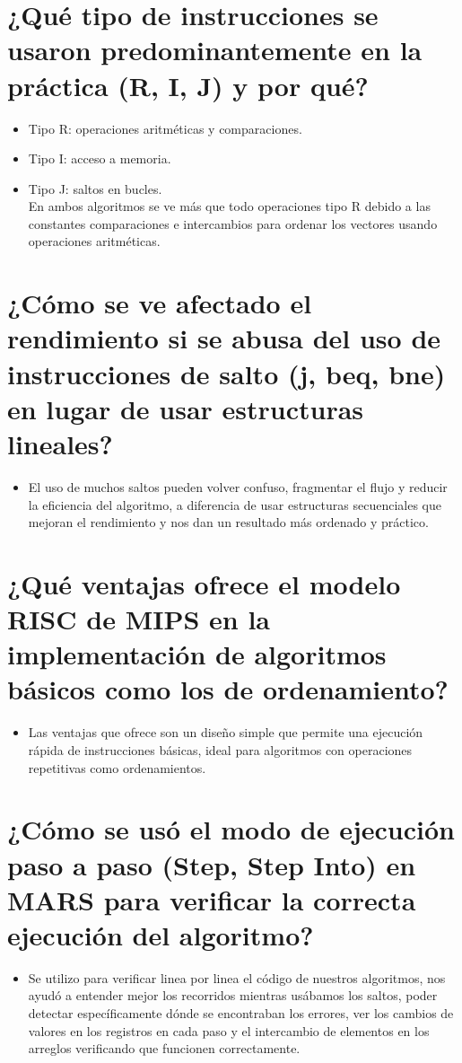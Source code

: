 \documentclass[12pt]{article}
\begin{document}
\section{¿Qué tipo de instrucciones se usaron predominantemente en la práctica (R, I, J) y por 
qué?}
\begin{itemize}
    \item Tipo R: operaciones aritméticas y comparaciones.
    \item Tipo I: acceso a memoria.
    \item Tipo J: saltos en bucles. 
    \\
    En ambos algoritmos se ve más que todo operaciones tipo R debido a las constantes comparaciones e intercambios para ordenar los vectores usando operaciones aritméticas.
\end{itemize}

\section{¿Cómo se ve afectado el rendimiento si se abusa del uso de instrucciones de salto (j, beq, 
bne) en lugar de usar estructuras lineales?}
\begin{itemize}
    \item El uso de muchos saltos pueden volver confuso, fragmentar el flujo y reducir la eficiencia del algoritmo, a diferencia de usar estructuras secuenciales que mejoran el rendimiento y nos dan un resultado más ordenado y práctico.
\end{itemize}

\section{¿Qué ventajas ofrece el modelo RISC de MIPS en la implementación de algoritmos 
básicos como los de ordenamiento?}
\begin{itemize}
    \item Las ventajas que ofrece son un diseño simple que permite una ejecución rápida de instrucciones básicas, ideal para algoritmos con operaciones repetitivas como ordenamientos.
\end{itemize}

\section{¿Cómo se usó el modo de ejecución paso a paso (Step, Step Into) en MARS para verificar 
la correcta ejecución del algoritmo?}
\begin{itemize}
    \item Se utilizo para verificar linea por linea el código de nuestros algoritmos, nos ayudó a entender mejor los recorridos mientras usábamos los saltos, poder detectar específicamente dónde se encontraban los errores, ver los cambios de valores en los registros en cada paso y el intercambio de elementos en los arreglos verificando que funcionen correctamente.
\end{itemize}
\end{document}
